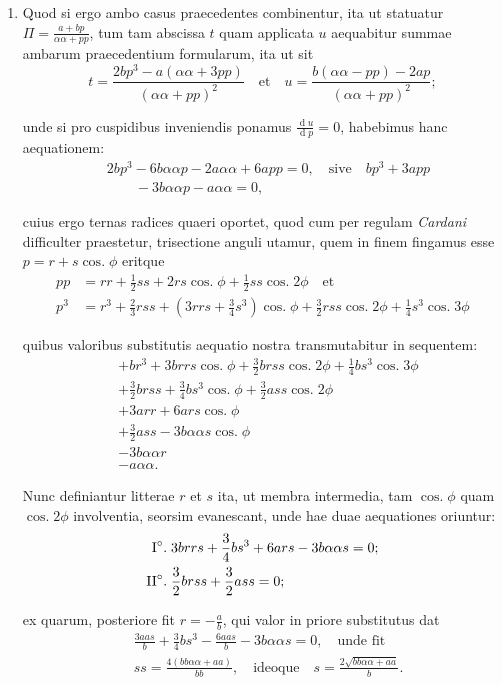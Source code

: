 \documentclass[10pt,a4paper]{article}
\DeclareMathOperator{\cosg}{cos.}
\begin{document}
\begin{paracol}{2}
\begin{enumerate}[topsep=1px]
		\switchcolumn*	
		
		\item Quod si ergo ambo casus praecedentes combinentur, ita ut statuatur $\Pi=\frac{a + bp}{\alpha \alpha + pp}$, tum tam abscissa $t$ quam applicata $u$ aequabitur summae ambarum praecedentium formularum, ita ut sit
		\[
			t = \frac{2bp^3 - a(\alpha \alpha + 3pp)}{(\alpha \alpha + pp)^2} \quad \text{et} \quad u = \frac{b(\alpha \alpha - pp)-2ap}{(\alpha \alpha + pp)^2};
		\]
		\par unde si pro cuspidibus inveniendis ponamus $\frac{\operatorname{d}u}{\operatorname{d}p} = 0$, habebimus hanc aequationem:
		\begin{align*}
			&2bp^3-6b\alpha \alpha p -2a \alpha \alpha +6a pp = 0, \quad \text{sive} \quad bp^3+3app\\
			&\qquad-3b\alpha \alpha p - a\alpha \alpha = 0,
		\end{align*}
		\par cuius ergo ternas radices quaeri oportet, quod cum per regulam \textit{Cardani} difficulter praestetur, trisectione anguli utamur, quem in finem fingamus esse $p=r+s\cosg \phi$ eritque
		\begin{align*}
			pp & = rr + \frac{1}{2}ss +2rs \cosg\phi + \frac{1}{2}ss \cosg 2\phi \quad \text{et}\\
			p^3 & = r^3+\frac{2}{3}rss + (3rrs+\frac{3}{4}s^3)\cosg \phi + \frac{3}{2} rss \cosg 2\phi+\frac{1}{4}s^3\cosg 3\phi
		\end{align*}
		\par quibus valoribus substitutis aequatio nostra transmutabitur in sequentem:
		\begin{align*}
			&+br^3+3brrs \cosg \phi + \frac{3}{2}brss \cosg 2\phi+ \frac{1}{4}bs^3\cosg 3\phi\\
			&+\frac{3}{2}brss + \frac{3}{4}bs^3\cosg \phi + \frac{3}{2}ass \cosg 2\phi\\
			&+3arr + 6ars \cosg \phi\\
			&+\frac{3}{2}ass - 3b\alpha \alpha s \cosg \phi\\
			&-3b\alpha \alpha r\\
			&-a \alpha \alpha.
		\end{align*}
		\par Nunc definiantur litterae $r$ et $s$ ita, ut membra intermedia, tam $\cosg \phi$ quam $\cosg 2\phi$ involventia, seorsim evanescant, unde hae duae aequationes oriuntur:
		\begin{align*}
			\text{I}\degree.\; &3brrs + \frac{3}{4}bs^3+6ars-3b\alpha \alpha s = 0;\\
			\text{II}\degree.\;& \frac{3}{2}brss+\frac{3}{2}ass = 0;
		\end{align*}
		\par ex quarum, posteriore fit $r=-\frac{a}{b}$, qui valor in priore substitutus dat
		\begin{align*}
			&\frac{3aas}{b}+\frac{3}{4}bs^3-\frac{6aas}{b}-3b\alpha \alpha s = 0, \quad \text{unde fit}\\
			&ss = \frac{4(bb\alpha \alpha + aa)}{bb}, \quad \text{ideoque} \quad s = \frac{2\sqrt{bb\alpha \alpha + aa}}{b}.
		\end{align*}
				

\end{enumerate}
\end{paracol}
\end{document}
